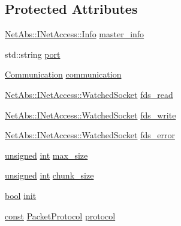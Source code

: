\subsection*{Protected Attributes}
\begin{DoxyCompactItemize}
\item 
\hyperlink{classbpt_1_1_net_abs_1_1_i_net_access_1_1_info}{Net\-Abs\-::\-I\-Net\-Access\-::\-Info} \hyperlink{classbpt_1_1_net_com_1_1_communicator_aac0ed4da91e2e78604212d6255294b2f}{master\-\_\-info}
\item 
std\-::string \hyperlink{classbpt_1_1_net_com_1_1_communicator_a6b6676ed095581315ffc75dd7d9a1ceb}{port}
\item 
\hyperlink{namespacebpt_1_1_net_com_af30d27373a967c6e6bcbf97963e2ab1d}{Communication} \hyperlink{classbpt_1_1_net_com_1_1_communicator_a53ec8ce1b7e1e68753aefe6eb63dca19}{communication}
\item 
\hyperlink{classbpt_1_1_net_abs_1_1_i_net_access_1_1_watched_socket}{Net\-Abs\-::\-I\-Net\-Access\-::\-Watched\-Socket} \hyperlink{classbpt_1_1_net_com_1_1_communicator_abfe7fd9cd005999663f6ee85d184759e}{fds\-\_\-read}
\item 
\hyperlink{classbpt_1_1_net_abs_1_1_i_net_access_1_1_watched_socket}{Net\-Abs\-::\-I\-Net\-Access\-::\-Watched\-Socket} \hyperlink{classbpt_1_1_net_com_1_1_communicator_a3b86bd00b6ce73ca212cfdc50a840ef3}{fds\-\_\-write}
\item 
\hyperlink{classbpt_1_1_net_abs_1_1_i_net_access_1_1_watched_socket}{Net\-Abs\-::\-I\-Net\-Access\-::\-Watched\-Socket} \hyperlink{classbpt_1_1_net_com_1_1_communicator_a7ea7bb6154894003811a726d4faa9180}{fds\-\_\-error}
\item 
\hyperlink{curses_8priv_8h_aca40206900cfc164654362fa8d4ad1e6}{unsigned} \hyperlink{term__entry_8h_ad65b480f8c8270356b45a9890f6499ae}{int} \hyperlink{classbpt_1_1_net_com_1_1_communicator_afbe043b1ffa7085bf34069b497445d33}{max\-\_\-size}
\item 
\hyperlink{curses_8priv_8h_aca40206900cfc164654362fa8d4ad1e6}{unsigned} \hyperlink{term__entry_8h_ad65b480f8c8270356b45a9890f6499ae}{int} \hyperlink{classbpt_1_1_net_com_1_1_communicator_a1c941811f9d42c8668d69a0a0d8b4128}{chunk\-\_\-size}
\item 
\hyperlink{term__entry_8h_a002004ba5d663f149f6c38064926abac}{bool} \hyperlink{classbpt_1_1_net_com_1_1_communicator_a1bc9521a2926982d00238be0558e57a3}{init}
\item 
\hyperlink{term__entry_8h_a57bd63ce7f9a353488880e3de6692d5a}{const} \hyperlink{namespacebpt_1_1_net_com_ae55ee05019d82af5d3cc17e7e0ebedff}{Packet\-Protocol} \hyperlink{classbpt_1_1_net_com_1_1_communicator_aac1e2e8c0b91c11f347c042e56f46041}{protocol}
\end{DoxyCompactItemize}
